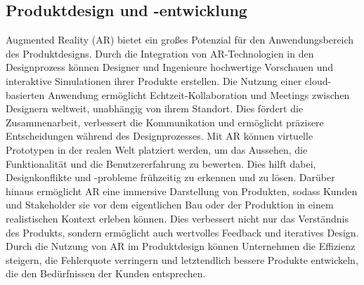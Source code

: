 \subsection{Produktdesign und -entwicklung}
Augmented Reality (AR) bietet ein großes Potenzial für den Anwendungsbereich
des Produktdesigns. Durch die Integration von AR-Technologien in den
Designprozess können Designer und Ingenieure hochwertige Vorschauen und
interaktive Simulationen ihrer Produkte erstellen. Die Nutzung einer
cloud-basierten Anwendung ermöglicht Echtzeit-Kollaboration und Meetings
zwischen Designern weltweit, unabhängig von ihrem Standort. Dies fördert die
Zusammenarbeit, verbessert die Kommunikation und ermöglicht präzisere
Entscheidungen während des Designprozesses. Mit AR können virtuelle Prototypen
in der realen Welt platziert werden, um das Aussehen, die Funktionalität und
die Benutzererfahrung zu bewerten. Dies hilft dabei, Designkonflikte und
-probleme frühzeitig zu erkennen und zu lösen. Darüber hinaus ermöglicht AR
eine immersive Darstellung von Produkten, sodass Kunden und Stakeholder sie vor
dem eigentlichen Bau oder der Produktion in einem realistischen Kontext erleben
können. Dies verbessert nicht nur das Verständnis des Produkts, sondern
ermöglicht auch wertvolles Feedback und iteratives Design. Durch die Nutzung
von AR im Produktdesign können Unternehmen die Effizienz steigern, die
Fehlerquote verringern und letztendlich bessere Produkte entwickeln, die den
Bedürfnissen der Kunden entsprechen.\cite{mourtzis2020augmented}

